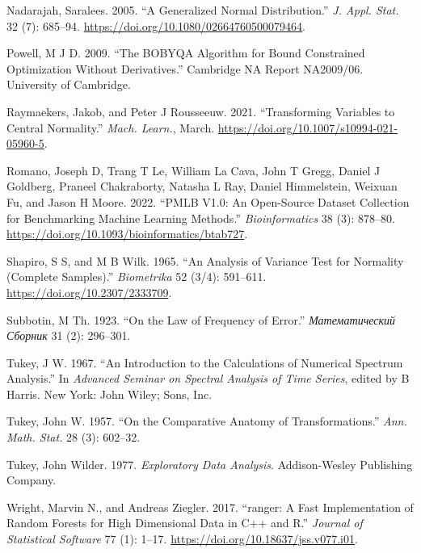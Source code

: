 \documentclass[
  a4paper,
]{article}
\newlength{\cslhangindent}
\newenvironment{CSLReferences}[2] %
 {\begin{list}{}{%
  \setlength{\itemindent}{0pt}
  \setlength{\leftmargin}{0pt}
  \setlength{\parsep}{0pt}
  \ifodd #1
   \setlength{\leftmargin}{\cslhangindent}
   \setlength{\itemindent}{-1\cslhangindent}
  \fi
  \setlength{\itemsep}{#2\baselineskip}}}
 {\end{list}}
\begin{document}
\begin{CSLReferences}{1}{0}
Nadarajah, Saralees. 2005. {``A Generalized Normal Distribution.''}
\emph{J. Appl. Stat.} 32 (7): 685--94.
\url{https://doi.org/10.1080/02664760500079464}.

Powell, M J D. 2009. {``The {BOBYQA} Algorithm for Bound Constrained
Optimization Without Derivatives.''} Cambridge NA Report NA2009/06.
University of Cambridge.

Raymaekers, Jakob, and Peter J Rousseeuw. 2021. {``Transforming
Variables to Central Normality.''} \emph{Mach. Learn.}, March.
\url{https://doi.org/10.1007/s10994-021-05960-5}.

Romano, Joseph D, Trang T Le, William La Cava, John T Gregg, Daniel J
Goldberg, Praneel Chakraborty, Natasha L Ray, Daniel Himmelstein,
Weixuan Fu, and Jason H Moore. 2022. {``{PMLB} V1.0: An Open-Source
Dataset Collection for Benchmarking Machine Learning Methods.''}
\emph{Bioinformatics} 38 (3): 878--80.
\url{https://doi.org/10.1093/bioinformatics/btab727}.

Shapiro, S S, and M B Wilk. 1965. {``An Analysis of Variance Test for
Normality (Complete Samples).''} \emph{Biometrika} 52 (3/4): 591--611.
\url{https://doi.org/10.2307/2333709}.

Subbotin, M Th. 1923. {``On the Law of Frequency of Error.''}
\emph{Математический Сборник} 31 (2): 296--301.

Tukey, J W. 1967. {``An Introduction to the Calculations of Numerical
Spectrum Analysis.''} In \emph{Advanced Seminar on Spectral Analysis of
Time Series}, edited by B Harris. New York: John Wiley; Sons, Inc.

Tukey, John W. 1957. {``On the Comparative Anatomy of
Transformations.''} \emph{Ann. Math. Stat.} 28 (3): 602--32.

Tukey, John Wilder. 1977. \emph{Exploratory Data Analysis}.
Addison-Wesley Publishing Company.

Wright, Marvin N., and Andreas Ziegler. 2017. {``{ranger}: A Fast
Implementation of Random Forests for High Dimensional Data in {C++} and
{R}.''} \emph{Journal of Statistical Software} 77 (1): 1--17.
\url{https://doi.org/10.18637/jss.v077.i01}.


\end{CSLReferences}
\end{document}

